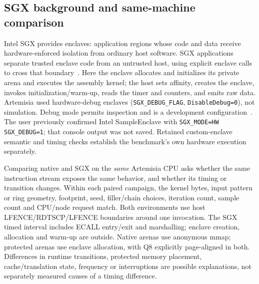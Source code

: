 \documentclass[11pt,letterpaper]{article}
\begin{document}
\subsection{SGX background and same-machine comparison}
Intel SGX provides enclaves: application regions whose code and data receive
hardware-enforced isolation from ordinary host software. SGX applications
separate trusted enclave code from an untrusted host, using explicit enclave
calls to cross that boundary~\cite{sgx}. Here the enclave allocates and
initializes its private arena and executes the assembly kernel; the host
sets affinity, creates the enclave, invokes initialization/warm-up, reads the
timer and counters, and emits raw data. Artemisia used hardware-debug enclaves
(\texttt{SGX\_DEBUG\_FLAG}, \texttt{DisableDebug=0}), not simulation. Debug
mode permits inspection and is a development configuration~\cite{sgx}.
The user previously confirmed Intel SampleEnclave with
\texttt{SGX\_MODE=HW SGX\_DEBUG=1}; that console output was not saved.
Retained custom-enclave semantic and timing checks establish the benchmark's
own hardware execution separately.

Comparing native and SGX on the \emph{same} Artemisia CPU asks whether the same
instruction stream exposes the same behavior, and whether its timing or
transition changes. Within each paired campaign, the kernel bytes, input
pattern or ring geometry, footprint, seed, filler/chain choices, iteration
count, sample count and CPU/node request match. Both environments use host
LFENCE/RDTSCP/LFENCE boundaries around one invocation. The SGX timed interval
includes ECALL entry/exit and marshalling; enclave creation, allocation and
warm-up are outside. Native arenas use anonymous mmap; protected arenas use
enclave allocation, with Q8 explicitly page-aligned in both. Differences in
runtime transitions, protected memory placement, cache/translation state,
frequency or interruptions are possible explanations, not separately measured
causes of a timing difference.
\end{document}

